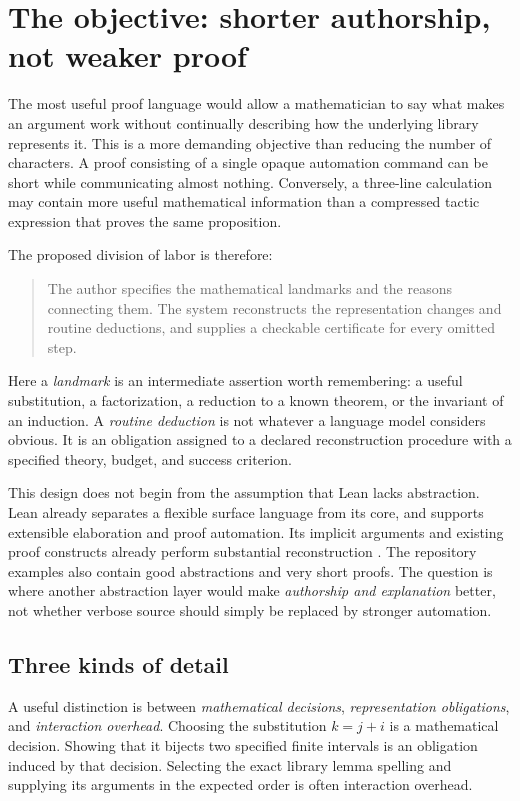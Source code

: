 \documentclass[11pt,a4paper]{article}
\theoremstyle{remark}
\begin{document}
\section{The objective: shorter authorship, not weaker proof}
\label{sec:objective}
The most useful proof language would allow a mathematician to say what makes an argument work without continually describing how the underlying library represents it. This is a more demanding objective than reducing the number of characters. A proof consisting of a single opaque automation command can be short while communicating almost nothing. Conversely, a three-line calculation may contain more useful mathematical information than a compressed tactic expression that proves the same proposition.

The proposed division of labor is therefore:
\begin{quote}
The author specifies the mathematical landmarks and the reasons connecting them. The system reconstructs the representation changes and routine deductions, and supplies a checkable certificate for every omitted step.
\end{quote}
Here a \emph{landmark} is an intermediate assertion worth remembering: a useful substitution, a factorization, a reduction to a known theorem, or the invariant of an induction. A \emph{routine deduction} is not whatever a language model considers obvious. It is an obligation assigned to a declared reconstruction procedure with a specified theory, budget, and success criterion.

This design does not begin from the assumption that Lean lacks abstraction. Lean already separates a flexible surface language from its core, and supports extensible elaboration and proof automation. Its implicit arguments and existing proof constructs already perform substantial reconstruction \cite{lean4,lean-elab}. The repository examples also contain good abstractions and very short proofs. The question is where another abstraction layer would make \emph{authorship and explanation} better, not whether verbose source should simply be replaced by stronger automation.

\subsection{Three kinds of detail}
A useful distinction is between \emph{mathematical decisions}, \emph{representation obligations}, and \emph{interaction overhead}. Choosing the substitution $k=j+i$ is a mathematical decision. Showing that it bijects two specified finite intervals is an obligation induced by that decision. Selecting the exact library lemma spelling and supplying its arguments in the expected order is often interaction overhead.
\end{document}
